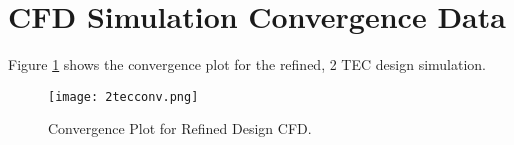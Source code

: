 \appendix

\section{CFD Simulation Convergence Data}
\label{cha:CFDconverg}

Figure \ref{fig:2tecconv} shows the convergence plot for the refined, 2 TEC design simulation.

\begin{figure}[!htb]
	\centering
	\texttt{[image: 2tecconv.png]}
	\caption[Convergence Plot for Refined Design CFD.]{Convergence Plot for Refined Design CFD.}
	\label{fig:2tecconv}
\end{figure} 
\FloatBarrier


